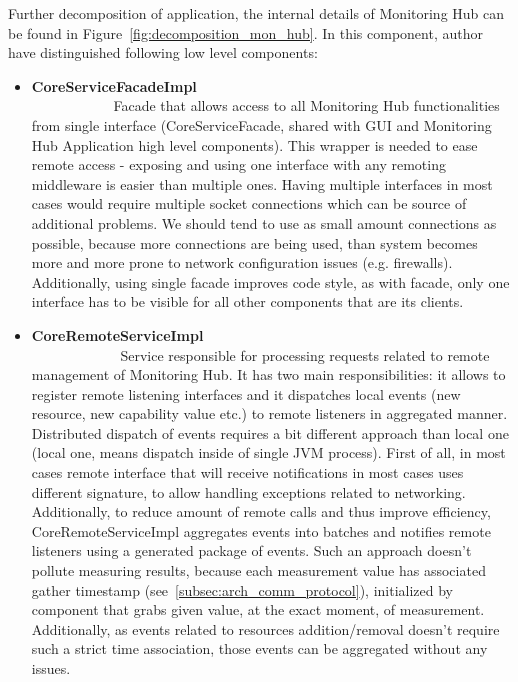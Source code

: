 Further decomposition of application, the internal details of Monitoring Hub can be found
in Figure~\ref{fig:decomposition_mon_hub}. In this component, author have distinguished following low level components:

\begin{itemize}

 \item {\bf CoreServiceFacadeImpl}~~~~~~~~~~~~~~~~~~~~~~~~~~~~~~~~~~~~~~~~~~~~~~~~~~~~~~~~\linebreak
Facade that allows access to all Monitoring Hub functionalities from single interface (CoreServiceFacade, shared with
GUI and Monitoring Hub Application high level components). This wrapper is needed to ease remote access - exposing
and using one interface with any remoting middleware is easier than multiple ones. Having multiple interfaces in most
cases would require multiple socket connections which can be source of additional problems. We should tend to use as
small amount connections as possible, because more connections are being used, than system becomes more and more prone
to network configuration issues (e.g. firewalls).
Additionally, using single facade improves code style, as with facade, only one interface has to be visible for all
other components that are its clients.

 \item {\bf CoreRemoteServiceImpl}~~~~~~~~~~~~~~~~~~~~~~~~~~~~~~~~~~~~~~~~~~~~~~~~~~~~~~~~\linebreak
Service responsible for processing requests related to remote management of Monitoring Hub. It has two main
responsibilities: it allows to register remote listening interfaces and it dispatches local events (new resource,
new capability value etc.) to remote listeners in aggregated manner. Distributed dispatch of events requires a bit
different approach than local one (local one, means dispatch inside of single JVM process). First of all, in most cases
remote interface that will receive notifications in most cases uses different signature, to allow handling exceptions
related to networking. Additionally, to reduce amount of remote calls and thus improve efficiency,
CoreRemoteServiceImpl aggregates events into batches and notifies remote listeners using a generated package of
events. Such an approach doesn't pollute measuring results, because each measurement value has associated gather
timestamp (see~\ref{subsec:arch_comm_protocol}), initialized by component that grabs given value, at the exact moment,
of measurement.
Additionally, as events related to resources addition/removal doesn't require such a strict time association, those
events can be aggregated without any issues.


\end{itemize}

